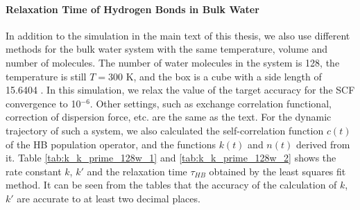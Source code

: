 
\paragraph{Relaxation Time of Hydrogen Bonds in Bulk Water}\label{rate_const_and_tau_R_128w}
% 
In addition to the simulation in the main text of this thesis, we also use different methods for the bulk water system with the same temperature,
volume and number of molecules. The number of water molecules in the system is 128, the temperature is still $T=300$ K, and the box is a cube with a side length of 15.6404 \A. 
In this simulation, we relax the value of the target accuracy for the SCF convergence to 10$^{-6}$. 
Other settings, such as exchange correlation functional, correction of dispersion force, etc. are the same as the text. 
For the dynamic trajectory of such a system, we also calculated the self-correlation function $c(t)$ of the HB population operator, 
and the functions $k(t)$ and $n(t)$ derived from it. 
Table \ref{tab:k_k_prime_128w_1} and \ref{tab:k_k_prime_128w_2} shows the rate constant $k$, $k'$ and 
the relaxation time $\tau_{HB}$ obtained by the least squares fit method. 
It can be seen from the tables that the accuracy of the calculation of $k$, $k'$ are accurate to at least two decimal places.

